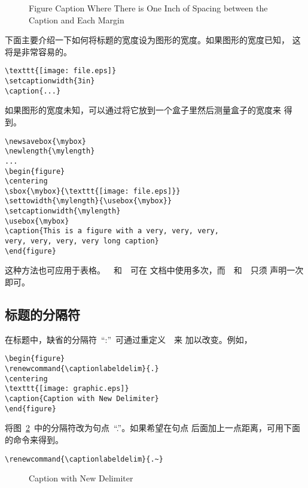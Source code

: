 \begin{figure}
	\setcaptionmargin{1in}
	\centering
	\resizebox{2in}{!}{\usebox{\graphic}}
	\caption{Figure Caption Where There is One Inch of Spacing 
		between the Caption and Each Margin}\label{fig:setcapmargin}
\end{figure}

下面主要介绍一下如何将标题的宽度设为图形的宽度。如果图形的宽度已知，
这将是非常容易的。
\begin{Verbatim}[xleftmargin=1cm]
\texttt{[image: file.eps]} 
\setcaptionwidth{3in} 
\caption{...}
\end{Verbatim}
如果图形的宽度未知，可以通过将它放到一个盒子里然后测量盒子的宽度来
得到。
\begin{Verbatim}[xleftmargin=1cm]
\newsavebox{\mybox} 
\newlength{\mylength} 
... 
\begin{figure} 
\centering 
\sbox{\mybox}{\texttt{[image: file.eps]}} 
\settowidth{\mylength}{\usebox{\mybox}} 
\setcaptionwidth{\mylength} 
\usebox{\mybox} 
\caption{This is a figure with a very, very, very, 
very, very, very, very long caption} 
\end{figure}
\end{Verbatim}
这种方法也可应用于表格。~~和~~可在
文档中使用多次，而~~和~~只须
声明一次即可。

\subsection{标题的分隔符}

在标题中，缺省的分隔符~``:''~可通过重定义~~来
加以改变。例如，
\begin{Verbatim}[xleftmargin=1cm]
\begin{figure} 
\renewcommand{\captionlabeldelim}{.} 
\centering 
\texttt{[image: graphic.eps]} 
\caption{Caption with New Delimiter} 
\end{figure}
\end{Verbatim}
将图~\ref{fig:newdelim}~中的分隔符改为句点~``.''。如果希望在句点
后面加上一点距离，可用下面的命令来得到。
\begin{Verbatim}[xleftmargin=1cm]
\renewcommand{\captionlabeldelim}{.~}
\end{Verbatim}

\begin{figure} 
	\renewcommand{\captionlabeldelim}{.} 
	\centering 
	\resizebox{2in}{!}{\usebox{\graphic}}
	\caption{Caption with New Delimiter}\label{fig:newdelim}
\end{figure}


